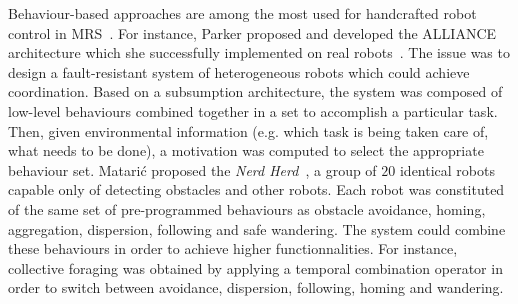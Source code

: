       Behaviour-based approaches are among the most used for handcrafted robot control in MRS~\parencite{Arkin1998a, Mataric2008, Parker2008}. For instance, Parker proposed and developed the ALLIANCE architecture which she successfully implemented on real robots~\parencite{Parker1994}. The issue was to design a fault-resistant system of heterogeneous robots which could achieve coordination. Based on a subsumption architecture, the system was composed of low-level behaviours combined together in a set to accomplish a particular task. Then, given environmental information (e.g. which task is being taken care of, what needs to be done), a motivation was computed to select the appropriate behaviour set. Matarić proposed the \emph{Nerd Herd}~\parencite{Mataric1995}, a group of $20$ identical robots capable only of detecting obstacles and other robots. Each robot was constituted of the same set of pre-programmed behaviours as obstacle avoidance, homing, aggregation, dispersion, following and safe wandering. The system could combine these behaviours in order to achieve higher functionnalities. For instance, collective foraging was obtained by applying a temporal combination operator in order to switch between avoidance, dispersion, following, homing and wandering. 








